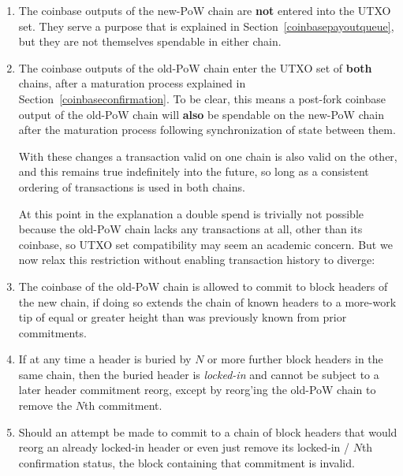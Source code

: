 \begin{enumerate}

  \item

    The coinbase outputs of the new-PoW chain are \textbf{not} entered
    into the UTXO set.  They serve a purpose that is explained in
    Section~\ref{coinbasepayoutqueue}, but they are not themselves
    spendable in either chain.

  \item

    The coinbase outputs of the old-PoW chain enter the UTXO set
    of \textbf{both} chains, after a maturation process explained in
    Section~\ref{coinbaseconfirmation}.  To be clear, this means a
    post-fork coinbase output of the old-PoW chain will \textbf{also}
    be spendable on the new-PoW chain after the maturation process
    following synchronization of state between them.


With these changes a transaction valid on one chain is also valid on
the other, and this remains true indefinitely into the future, so long
as a consistent ordering of transactions is used in both chains.

At this point in the explanation a double spend is trivially not
possible because the old-PoW chain lacks any transactions at all,
other than its coinbase, so UTXO set compatibility may seem an
academic concern.  But we now relax this restriction without enabling
transaction history to diverge:


  \item

    The coinbase of the old-PoW chain is allowed to commit to block
    headers of the new chain, if doing so extends the chain of known
    headers to a more-work tip of equal or greater height than was
    previously known from prior commitments.

  \item

    If at any time a header is buried by $N$ or more further block
    headers in the same chain, then the buried header
    is \emph{locked-in} and cannot be subject to a later header
    commitment reorg, except by reorg'ing the old-PoW chain to remove
    the $N$th commitment.

  \item

    Should an attempt be made to commit to a chain of block headers
    that would reorg an already locked-in header or even just remove
    its locked-in / $N$th confirmation status, the block containing
    that commitment is invalid.


\end{enumerate}
